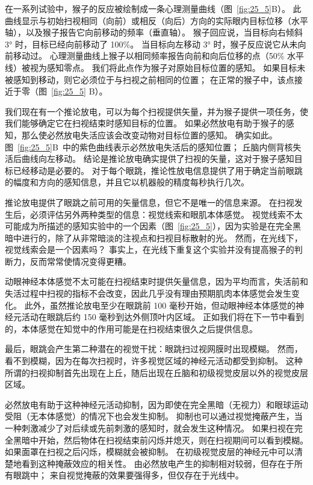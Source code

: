 在一系列试验中，猴子的反应被绘制成一条心理测量曲线（图~\ref{fig:25_5}B）。
此曲线显示与初始扫视相同（向前）或相反（向后）方向的实际眼内目标位移（水平轴），以及猴子报告它向前移动的频率（垂直轴）。
猴子回应说，当目标向右倾斜 3° 时，目标已经向前移动了 100\%。
当目标向左移动 3° 时，猴子反应说它从未向前移动过。
心理测量曲线上猴子以相同频率报告向前和向后位移的点（50\% 水平线）被视为感知零点。
我们将此点作为猴子对原始目标位置的感知。
如果目标未被感知到移动，则它必须位于与扫视之前相同的位置；
在正常的猴子中，该点接近于零（图~\ref{fig:25_5} B）。


我们现在有一个推论放电，可以为每个扫视提供矢量，并为猴子提供一项任务，使我们能够确定它在扫视结束时感知目标的位置。
如果必然放电有助于猴子的感知，那么使必然放电失活应该会改变动物对目标位置的感知。
确实如此。 图~\ref{fig:25_5}B~中的紫色曲线表示必然放电失活后的感知位置；
丘脑内侧背核失活后曲线向左移动。
结论是推论放电确实提供了扫视的矢量，这对于猴子感知目标已经移动是必要的。
对于每个眼跳，推论性放电信息提供了用于确定当前眼跳的幅度和方向的感知信息，并且它以机器般的精度每秒执行几次。


推论放电提供了眼跳之前可用的矢量信息，但它不是唯一的信息来源。
在扫视发生后，必须评估另外两种类型的信息：视觉线索和眼肌本体感觉。
视觉线索不太可能成为所描述的感知实验中的一个因素（图~\ref{fig:25_5}），因为实验是在完全黑暗中进行的，除了从非常暗淡的注视点和扫视目标散射的光。
然而，在光线下，视觉线索会是一个因素吗？
事实上，在光线下重复这个实验并没有提高猴子的判断力，反而常常使情况变得更糟。


动眼神经本体感觉不太可能在扫视结束时提供矢量信息，因为平均而言，失活前和失活过程中扫视的指标不会改变，因此几乎没有理由预期肌肉本体感觉会发生变化。
此外，虽然推论放电至少在眼跳前 100 毫秒开始，但动眼神经本体感觉的神经元活动在眼跳后约 150 毫秒到达外侧顶叶内区域。
正如我们将在下一节中看到的，本体感觉在知觉中的作用可能是在扫视结束很久之后提供信息。


最后，眼跳会产生第二种潜在的视觉干扰：眼跳扫过视网膜时出现模糊。
然而，看不到模糊，因为在每次扫视时，许多视觉区域的神经元活动都受到抑制。
这种所谓的扫视抑制首先出现在上丘，随后出现在丘脑和初级视觉皮层以外的视觉皮层区域。


必然放电有助于这种神经元活动抑制，因为即使在完全黑暗（无视力）和眼球运动受阻（无本体感觉）的情况下也会发生抑制。
抑制也可以通过视觉掩蔽产生，当一种刺激减少了对后续或先前刺激的感知时，就会发生这种情况。
如果扫视在完全黑暗中开始，然后物体在扫视结束前闪烁并熄灭，则在扫视期间可以看到模糊。
如果面罩在扫视之后闪烁，模糊就会被抑制。
在初级视觉皮层的神经元中可以清楚地看到这种掩蔽效应的相关性。
由必然放电产生的抑制相对较弱，但存在于所有眼跳中；
来自视觉掩蔽的效果要强得多，但仅存在于光线中。



